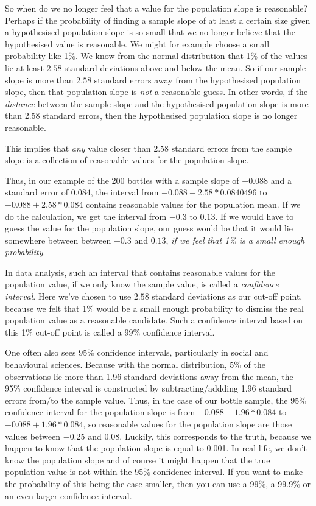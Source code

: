 \documentclass[]{report}\usepackage[]{graphicx}\usepackage[]{color}
\begin{document}
So when do we no longer feel that a value for the population slope is reasonable? Perhaps if the probability of finding a sample slope of at least a certain size given a hypothesised population slope is so small that we no longer believe that the hypothesised value is reasonable. We might for example choose a small probability like 1\%. We know from the normal distribution that 1\% of the values lie at least $2.58$ standard deviations above and below the mean. So if our sample slope is more than $2.58$ standard errors away from the hypothesised population slope, then that population slope is \textit{not} a reasonable guess. In other words, if the \textit{distance} between the sample slope and the hypothesised population slope is more than 2.58 standard errors, then the hypothesised population slope is no longer reasonable.

This implies that \textit{any} value closer than $2.58$ standard errors from the sample slope is a collection of reasonable values for the population slope.

Thus, in our example of the 200 bottles with a sample slope of $-0.088$ and a standard error of $0.084$, the interval from $-0.088- 2.58* 0.0840496$ to $-0.088+ 2.58* 0.084$ contains reasonable values for the population mean. If we do the calculation, we get the interval from $-0.3$ to $0.13$. If we would have to guess the value for the population slope, our guess would be that it would lie somewhere between between $-0.3$ and $0.13$, \textit{if we feel that 1\% is a small enough probability}.

In data analysis, such an interval that contains reasonable values for the population value, if we only know the sample value, is called a \textit{confidence interval}. Here we've chosen to use $2.58$ standard deviations as our cut-off point, because we felt that 1\% would be a small enough probability to dismiss the real population value as a reasonable candidate. Such a confidence interval based on this 1\% cut-off point is called a 99\% confidence interval.

One often also sees 95\% confidence intervals, particularly in social and behavioural sciences. Because with the normal distribution, 5\% of the observations lie more than 1.96 standard deviations away from the mean, the 95\% confidence interval is constructed by subtracting/addding 1.96 standard errors from/to the sample value. Thus, in the case of our bottle sample, the 95\% confidence interval for the population slope is from $-0.088- 1.96* 0.084$ to $-0.088+ 1.96* 0.084$, so reasonable values for the population slope are those values between $-0.25$ and $0.08$. Luckily, this corresponds to the truth, because we happen to know that the population slope is equal to 0.001. In real life, we don't know the population slope and of course it might happen that the true population value is not within the 95\% confidence interval. If you want to make the probability of this being the case smaller, then you can use a 99\%, a 99.9\% or an even larger confidence interval.
\end{document}
